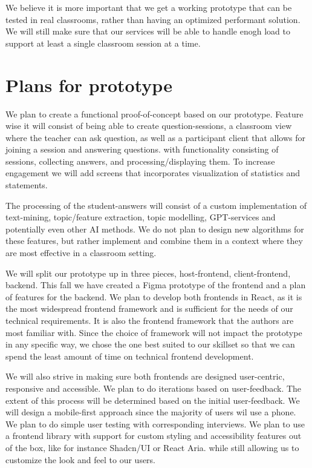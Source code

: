 We believe it is more important that we get a working prototype that can be tested in real classrooms, rather than having an optimized performant solution. We will still make sure that our services will be able to handle enogh load to support at least a single classroom session at a time.


\section{Plans for prototype}
We plan to create a functional proof-of-concept based on our prototype. Feature wise it will consist of being able to create question-sessions, a classroom view where the teacher can ask question, as well as a participant client that allows for joining a session and answering questions. with functionality consisting of sessions, collecting answers, and processing/displaying them. To increase engagement we will add screens that incorporates visualization of statistics and statements.  

The processing of the student-answers will consist of a custom implementation of text-mining, topic/feature extraction, topic modelling, GPT-services and potentially even other AI methods. We do not plan to design new algorithms for these features, but rather implement and combine them in a context where they are most effective in a classroom setting. 

We will split our prototype up in three pieces, host-frontend, client-frontend, backend. This fall we have created a Figma prototype of the frontend and a plan of features for the backend. We plan to develop both frontends in React, as it is the most widespread frontend framework and is sufficient for the needs of our technical requirements. It is also the frontend framework that the authors are most familiar with. Since the choice of framework will not impact the prototype in any specific way, we chose the one best suited to our skillset so that we can spend the least amount of time on technical frontend development.

We will also strive in making sure both frontends are designed user-centric, responsive and accessible. We plan to do iterations based on user-feedback. The extent of this process will be determined based on the initial user-feedback. We will design a mobile-first approach since the majority of users wil use a phone. We plan to do simple user testing with corresponding interviews. We plan to use a frontend library with support for custom styling and accessibility features out of the box, like for instance Shadcn/UI or React Aria.   while still allowing us to customize the look and feel to our users.


